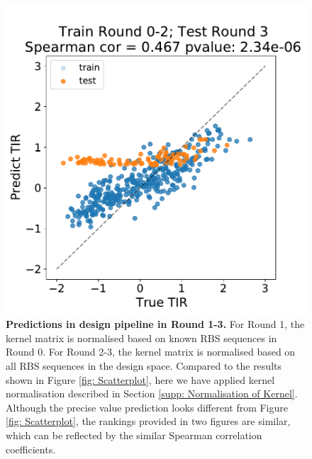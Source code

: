 \documentclass{scrartcl}[2013/05/29]%
\begin{document}
\begin{figure}[!ht]
    \includegraphics[scale = 0.35]{plots/Supplementary/scatter_abc1_TT_2.pdf}
    \caption{\textbf{Predictions in design pipeline in Round 1-3.} For Round 1, the kernel matrix is normalised based on known RBS sequences in Round 0.
    For Round 2-3, the kernel matrix is normalised based on all RBS sequences in the design space.
    Compared to the results shown in Figure \mbox{\ref{fig: Scatterplot}}, here we have applied kernel normalisation described in Section \mbox{\ref{supp: Normalisation of Kernel}}. Although the precise value prediction looks different from Figure \mbox{\ref{fig: Scatterplot}}, the rankings provided in two figures are similar, which can be reflected by the similar Spearman correlation coefficients.
    }
    \label{fig:scatter abc1 TT.}
\end{figure}

\end{document}
